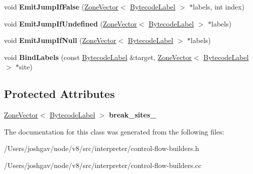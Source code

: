 \begin{DoxyCompactItemize}
\item 
void {\bfseries Emit\+Jump\+If\+False} (\hyperlink{classv8_1_1internal_1_1_zone_vector}{Zone\+Vector}$<$ \hyperlink{classv8_1_1internal_1_1interpreter_1_1_bytecode_label}{Bytecode\+Label} $>$ $\ast$labels, int index)\hypertarget{classv8_1_1internal_1_1interpreter_1_1_breakable_control_flow_builder_a94323baa71c12d81b0d78fe3699ede2b}{}\label{classv8_1_1internal_1_1interpreter_1_1_breakable_control_flow_builder_a94323baa71c12d81b0d78fe3699ede2b}

\item 
void {\bfseries Emit\+Jump\+If\+Undefined} (\hyperlink{classv8_1_1internal_1_1_zone_vector}{Zone\+Vector}$<$ \hyperlink{classv8_1_1internal_1_1interpreter_1_1_bytecode_label}{Bytecode\+Label} $>$ $\ast$labels)\hypertarget{classv8_1_1internal_1_1interpreter_1_1_breakable_control_flow_builder_a04cdf88f8e8857dbf823f84838c05592}{}\label{classv8_1_1internal_1_1interpreter_1_1_breakable_control_flow_builder_a04cdf88f8e8857dbf823f84838c05592}

\item 
void {\bfseries Emit\+Jump\+If\+Null} (\hyperlink{classv8_1_1internal_1_1_zone_vector}{Zone\+Vector}$<$ \hyperlink{classv8_1_1internal_1_1interpreter_1_1_bytecode_label}{Bytecode\+Label} $>$ $\ast$labels)\hypertarget{classv8_1_1internal_1_1interpreter_1_1_breakable_control_flow_builder_a0d3b2c6bf49047d22d9a3bc5110eb61b}{}\label{classv8_1_1internal_1_1interpreter_1_1_breakable_control_flow_builder_a0d3b2c6bf49047d22d9a3bc5110eb61b}

\item 
void {\bfseries Bind\+Labels} (const \hyperlink{classv8_1_1internal_1_1interpreter_1_1_bytecode_label}{Bytecode\+Label} \&target, \hyperlink{classv8_1_1internal_1_1_zone_vector}{Zone\+Vector}$<$ \hyperlink{classv8_1_1internal_1_1interpreter_1_1_bytecode_label}{Bytecode\+Label} $>$ $\ast$site)\hypertarget{classv8_1_1internal_1_1interpreter_1_1_breakable_control_flow_builder_ad579515f9c772072cb83283cd3500abc}{}\label{classv8_1_1internal_1_1interpreter_1_1_breakable_control_flow_builder_ad579515f9c772072cb83283cd3500abc}

\end{DoxyCompactItemize}
\subsection*{Protected Attributes}
\begin{DoxyCompactItemize}
\item 
\hyperlink{classv8_1_1internal_1_1_zone_vector}{Zone\+Vector}$<$ \hyperlink{classv8_1_1internal_1_1interpreter_1_1_bytecode_label}{Bytecode\+Label} $>$ {\bfseries break\+\_\+sites\+\_\+}\hypertarget{classv8_1_1internal_1_1interpreter_1_1_breakable_control_flow_builder_a395d5eb407420154c98f4d1ef6815ddf}{}\label{classv8_1_1internal_1_1interpreter_1_1_breakable_control_flow_builder_a395d5eb407420154c98f4d1ef6815ddf}

\end{DoxyCompactItemize}


The documentation for this class was generated from the following files\+:\begin{DoxyCompactItemize}
\item 
/\+Users/joshgav/node/v8/src/interpreter/control-\/flow-\/builders.\+h\item 
/\+Users/joshgav/node/v8/src/interpreter/control-\/flow-\/builders.\+cc\end{DoxyCompactItemize}
